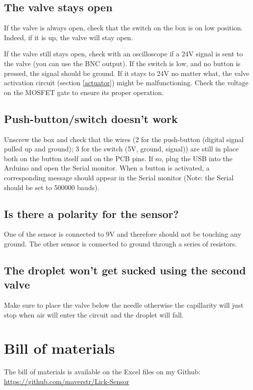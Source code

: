 \documentclass[a4paper]{article}
\begin{document}
\subsection{The valve stays open}
\label{staysOpen}
If the valve is always open, check that the switch on the box is on low position. Indeed, if it is up, the valve will stay open.

If the valve still stays open, check with an oscilloscope if a 24V signal is sent to the valve (you can use the BNC output). If the switch is low, and no button is pressed, the signal should be ground. If it stays to 24V no matter what, the valve activation circuit (section \ref{actuator}) might be malfunctioning. Check the voltage on the MOSFET gate to ensure its proper operation.

\subsection{Push-button/switch doesn't work}
Unscrew the box and check that the wires (2 for the push-button (digital signal pulled up and ground); 3 for the switch (5V, ground, signal)) are still in place both on the button itself and on the PCB pins.
If so, plug the USB into the Arduino and open the Serial monitor. When a button is activated, a corresponding message should appear in the Serial monitor (Note: the Serial should be set to 500000 bauds).

\subsection{Is there a polarity for the sensor?}
One of the sensor is connected to 9V and therefore should not be touching any ground. 
The other sensor is connected to ground through a series of resistors.

\subsection{The droplet won't get sucked using the second valve}
Make sure to place the valve below the needle otherwise the capillarity will just stop when air will enter the circuit and the droplet will fall.

\newpage
\appendix

\section{Bill of materials}
The bill of materials is available on the Excel files on my Github: \url{https://github.com/maverstr/Lick-Sensor}
\end{document}
